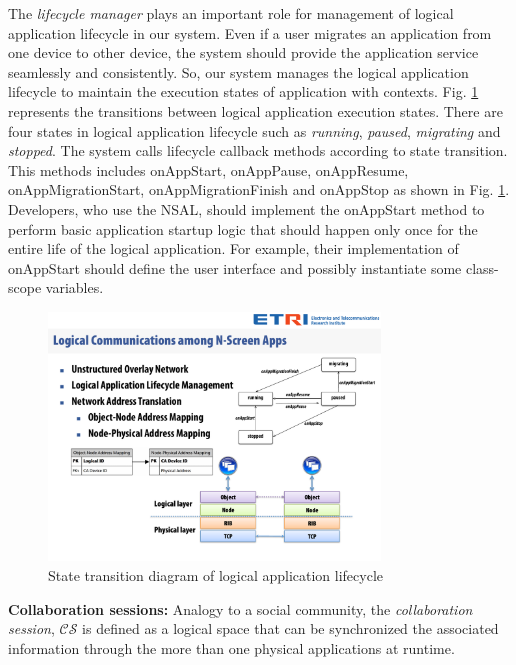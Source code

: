 \documentclass[conference]{IEEEtran}
\begin{document}
The \textit{lifecycle manager} plays an important role for management of logical application lifecycle in our system.
Even if a user migrates an application from one device to other device, 
the system should provide the application service  seamlessly and consistently. 
So, our system manages the logical application lifecycle to maintain the execution states of application with contexts.
Fig. \ref{fig:logicalapp} represents the transitions between logical application execution states. There are four states in logical application lifecycle such as \textit{running}, \textit{paused}, \textit{migrating} and \textit{stopped}. The system calls lifecycle callback methods according to state transition. This methods includes {\small \sffamily onAppStart, onAppPause, onAppResume, onAppMigrationStart, onAppMigrationFinish} and {\small \sffamily onAppStop} as shown in Fig. \ref{fig:logicalapp}.
Developers, who use the NSAL, should implement the {\small \sffamily onAppStart} method to perform basic application startup logic that should happen only once for the entire life of the logical application. For example, their implementation of {\small \sffamily onAppStart} should define the user interface and possibly instantiate some class-scope variables.
    \begin{figure}[htb] %
    \centering
    \includegraphics[width=8.8cm,keepaspectratio]{lifecycle}
    \caption{State transition diagram of logical application lifecycle}
    \label{fig:logicalapp}
    \end{figure}

\noindent
\textbf{Collaboration sessions: }
Analogy to a social community, the \textit{collaboration session}, $\mathcal{CS}$ is defined as a logical space  that can be synchronized the associated information through the more than one physical applications at runtime.
\end{document}
